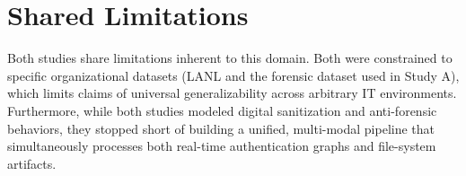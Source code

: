 \section{Shared Limitations}
Both studies share limitations inherent to this domain. Both were constrained to specific organizational datasets (LANL and the forensic dataset used in Study A), which limits claims of universal generalizability across arbitrary IT environments. Furthermore, while both studies modeled digital sanitization and anti-forensic behaviors, they stopped short of building a unified, multi-modal pipeline that simultaneously processes both real-time authentication graphs and file-system artifacts.
